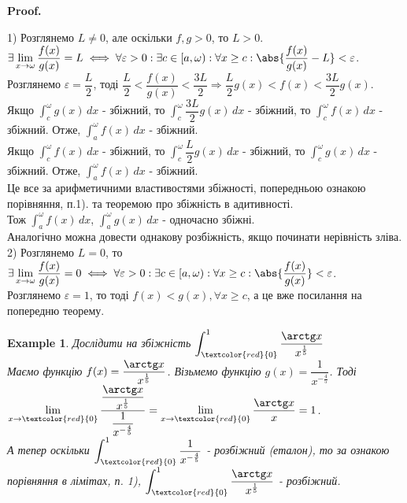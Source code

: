 \documentclass[a4paper, 10pt]{article}
\makeatletter
\def\huge{\displaystyle}
\def\bigline{\vspace{5mm}\\}
\def\qed{$\blacksquare$}
\theoremstyle{theoremdd}
\theoremstyle{theoremdd}
\theoremstyle{theoremdd}
\theoremstyle{theoremdd}
\theoremstyle{theoremdd}
\newtheorem{example}[theorem]{Example}
\theoremstyle{theoremdd}
\theoremstyle{theoremdd}
\theoremstyle{theoremdd}
\theoremstyle{theoremdd}
\renewenvironment{proof}[1][Proof.\\]{\par
\pushQED{\hfill \qed}%
\normalfont \topsep6\p@\@plus6\p@\relax
\trivlist
\item\relax
{\bfseries
#1\@addpunct{.}}\hspace\labelsep\ignorespaces
}{%
\popQED\endtrivlist\@endpefalse
}
\makeatother
\begin{document}
\begin{proof}
1) Розглянемо $L \neq 0$, але оскільки $f,g > 0$, то $L>0$.\\
$\exists \huge \lim_{x \to \omega} \dfrac{f(x)}{g(x)} = L \iff \forall \varepsilon > 0: \exists c \in [a,\omega): \forall x \geq c: \abs{\dfrac{f(x)}{g(x)} - L} < \varepsilon$.\\
Розглянемо $\varepsilon = \dfrac{L}{2}$, тоді $\dfrac{L}{2} < \dfrac{f(x)}{g(x)} < \dfrac{3L}{2} \Rightarrow \dfrac{L}{2}g(x) < f(x) < \dfrac{3L}{2}g(x)$.\\
Якщо $\huge\int_c^\omega g(x)\,dx$ - збіжний, то $\huge\int_c^\omega \dfrac{3L}{2} g(x)\,dx$ - збіжний, то $\huge\int_c^\omega f(x)\,dx$ - збіжний. Отже, $\huge\int_a^\omega f(x)\,dx$ - збіжний.\\
Якщо $\huge\int_c^\omega f(x)\,dx$ - збіжний, то $\huge\int_c^\omega \dfrac{L}{2} g(x)\,dx$ - збіжний, то $\huge\int_c^\omega g(x)\,dx$ - збіжний. Отже, $\huge\int_a^\omega f(x)\,dx$ - збіжний.\\
Це все за арифметичними властивостями збіжності, попередньою ознакою порівняння, п.1). та теоремою про збіжність в адитивності.\\
Тож $\huge\int_a^\omega f(x)\,dx$, $\huge\int_a^\omega g(x)\,dx$ - одночасно збіжні.\\
Аналогічно можна довести однакову розбіжність, якщо починати нерівність зліва.
\bigline
2) Розглянемо $L = 0$, то $\exists \huge \lim_{x \to \omega} \dfrac{f(x)}{g(x)} = 0 \iff \forall \varepsilon > 0: \exists c \in [a,\omega): \forall x \geq c: \abs{\dfrac{f(x)}{g(x)}} < \varepsilon$.\\
Розглянемо $\varepsilon = 1$, то тоді $f(x) < g(x), \forall x \geq c$, а це вже посилання на попередню теорему.
\end{proof}

\begin{example}
Дослідити на збіжність $\huge\int_{\textcolor{red}{0}}^{1} \dfrac{\arctg x}{x^{\frac{1}{5}}}$\\
Маємо функцію $f(x) = \dfrac{\arctg x}{x^{\frac{1}{5}}}$. Візьмемо функцію $g(x) = \dfrac{1}{x^{-\frac{4}{5}}}$. Тоді \\ $\huge \lim_{x \to \textcolor{red}{0}} \dfrac{\dfrac{\arctg x}{x^{\frac{1}{5}}}}{\dfrac{1}{x^{-\frac{4}{5}}}} = \lim_{x \to \textcolor{red}{0}} \dfrac{\arctg x}{x} = 1$.\\
А тепер оскільки $\huge\int_{\textcolor{red}{0}}^{1} \dfrac{1}{x^{-\frac{4}{5}}}$ - розбіжний (еталон), то за ознакою порівняння в лімітах, п. 1), $\huge\int_{\textcolor{red}{0}}^{1} \dfrac{\arctg x}{x^{\frac{1}{5}}}$ - розбіжний.
\\
\end{example}
\end{document}
